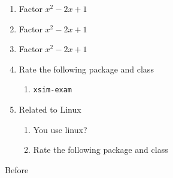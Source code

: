 \documentclass{article}
\begin{document}
\begin{enumerate}[save-ans=newww,columns=1,check-ans=true,show-pos=true,nosep,save-ref=true]
  \item Factor $x^{2}-2x+1$ 
  \item Factor $x^{2}-2x+1$ 
  \item Factor $x^{2}-2x+1$ 
  \item Rate the following package and class
        \begin{enumerate}
          \item \texttt{xsim-exam} %
        \end{enumerate}
    \item Related to Linux
    \begin{enumerate}[nosep,columns*=2]
      \item You use linux? 
      \item Rate the following package and class
    \end{enumerate}
\end{enumerate}


\stop


Before
\end{document}
